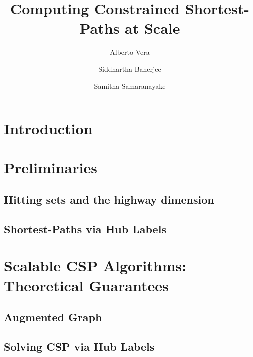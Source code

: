 \documentclass[format=acmsmall, screen=true]{acmart}
\begin{document}
\title{Computing Constrained Shortest-Paths at Scale}  
\author{Alberto Vera}
\author{Siddhartha Banerjee}
\author{Samitha Samaranayake}
\begin{abstract}
	
\end{abstract}
\maketitle



\section{Introduction}


\section{Preliminaries}
\label{sec:prelim}
\label{ssec:basic}


\subsection{Hitting sets and the highway dimension}
\label{ssec:hddef}


\subsection{Shortest-Paths via Hub Labels}
\label{ssec:hldef}


\section{Scalable CSP Algorithms: Theoretical Guarantees}
\label{sec:chd}


\subsection{Augmented Graph}
\label{ssec:aug}


\subsection{Solving CSP via Hub Labels}
\label{ssec:hlcsp}

\end{document}
